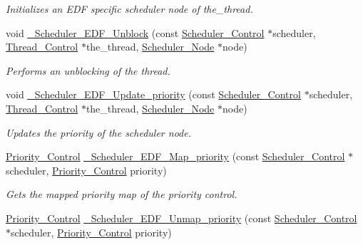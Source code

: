 \begin{DoxyCompactItemize}
\begin{DoxyCompactList}\small\item\em Initializes an E\+DF specific scheduler node of {\itshape the\+\_\+thread}. \end{DoxyCompactList}\item 
void \mbox{\hyperlink{group__RTEMSScoreSchedulerEDF_ga1c6a885d1cbf890d31be7c539db7c12e}{\+\_\+\+Scheduler\+\_\+\+E\+D\+F\+\_\+\+Unblock}} (const \mbox{\hyperlink{struct__Scheduler__Control}{Scheduler\+\_\+\+Control}} $\ast$scheduler, \mbox{\hyperlink{struct__Thread__Control}{Thread\+\_\+\+Control}} $\ast$the\+\_\+thread, \mbox{\hyperlink{structScheduler__Node}{Scheduler\+\_\+\+Node}} $\ast$node)
\begin{DoxyCompactList}\small\item\em Performs an unblocking of the thread. \end{DoxyCompactList}\item 
void \mbox{\hyperlink{group__RTEMSScoreSchedulerEDF_gaf8da2ab5519218b6509eeecb90f4f1d7}{\+\_\+\+Scheduler\+\_\+\+E\+D\+F\+\_\+\+Update\+\_\+priority}} (const \mbox{\hyperlink{struct__Scheduler__Control}{Scheduler\+\_\+\+Control}} $\ast$scheduler, \mbox{\hyperlink{struct__Thread__Control}{Thread\+\_\+\+Control}} $\ast$the\+\_\+thread, \mbox{\hyperlink{structScheduler__Node}{Scheduler\+\_\+\+Node}} $\ast$node)
\begin{DoxyCompactList}\small\item\em Updates the priority of the scheduler node. \end{DoxyCompactList}\item 
\mbox{\hyperlink{group__RTEMSScorePriority_ga59d02b58072d31a9a1cfe644557aefe2}{Priority\+\_\+\+Control}} \mbox{\hyperlink{group__RTEMSScoreSchedulerEDF_gac55915800e708341eac29411a6cecc63}{\+\_\+\+Scheduler\+\_\+\+E\+D\+F\+\_\+\+Map\+\_\+priority}} (const \mbox{\hyperlink{struct__Scheduler__Control}{Scheduler\+\_\+\+Control}} $\ast$scheduler, \mbox{\hyperlink{group__RTEMSScorePriority_ga59d02b58072d31a9a1cfe644557aefe2}{Priority\+\_\+\+Control}} priority)
\begin{DoxyCompactList}\small\item\em Gets the mapped priority map of the priority control. \end{DoxyCompactList}\item 
\mbox{\hyperlink{group__RTEMSScorePriority_ga59d02b58072d31a9a1cfe644557aefe2}{Priority\+\_\+\+Control}} \mbox{\hyperlink{group__RTEMSScoreSchedulerEDF_gad84ae7d48af80b7310fb64741fcfe324}{\+\_\+\+Scheduler\+\_\+\+E\+D\+F\+\_\+\+Unmap\+\_\+priority}} (const \mbox{\hyperlink{struct__Scheduler__Control}{Scheduler\+\_\+\+Control}} $\ast$scheduler, \mbox{\hyperlink{group__RTEMSScorePriority_ga59d02b58072d31a9a1cfe644557aefe2}{Priority\+\_\+\+Control}} priority)

\end{DoxyCompactItemize}
